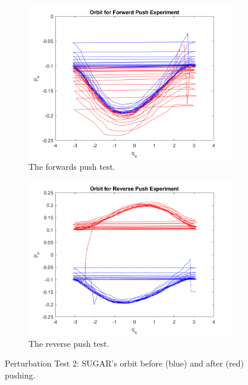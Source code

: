 \documentclass[journal,twoside,web, onecolumn, draftcls]{ieeecolor}
\begin{document}
\begin{figure}
    \centering
    \begin{subfigure}[ht]{0.49\linewidth}
        \includegraphics[width=\linewidth]{acrobot_fpush_orbit.png}
        \caption{The forwards push test.}
        \label{fig:acrobot-fpush-orbit}
    \end{subfigure}
    \begin{subfigure}[ht]{0.49\linewidth}
        \includegraphics[width=\linewidth]{acrobot_rpush_orbit.png}
        \caption{The reverse push test.}
        \label{fig:acrobot-rpush-orbit}
    \end{subfigure}
    \caption{Perturbation Test 2: SUGAR's orbit before (blue) and after (red) pushing.}
\end{figure}
\end{document}

